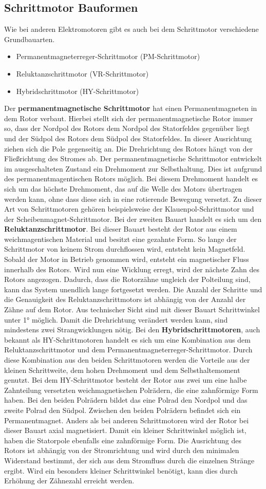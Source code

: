\subsection{Schrittmotor Bauformen}
Wie bei anderen Elektromotoren gibt es auch bei dem Schrittmotor verschiedene Grundbauarten. 
\begin{itemize}
	\item {Permanentmagneterreger-Schrittmotor (PM-Schrittmotor)}
	\item {Reluktanzschrittmotor (VR-Schrittmotor)}
	\item {Hybridschrittmotor (HY-Schrittmotor)}
\end{itemize}
Der \textbf{permanentmagnetische Schrittmotor} hat einen Permanentmagneten in dem Rotor verbaut. Hierbei stellt sich der permanentmagnetische Rotor immer so, dass der Nordpol des Rotors dem Nordpol des Statorfeldes gegenüber liegt und der Südpol des Rotors dem Südpol des Statorfeldes. In dieser Ausrichtung ziehen sich die Pole gegenseitig an. Die Drehrichtung des Rotors hängt von der Fließrichtung des Stromes ab. Der permanentmagnetische Schrittmotor entwickelt im ausgeschalteten Zustand ein Drehmoment zur Selbsthaltung. Dies ist aufgrund des permanentmagentischen Rotors möglich. Bei diesem Drehmoment handelt es sich um das höchste Drehmoment, das auf die Welle des Motors übertragen werden kann, ohne dass diese sich in eine rotierende Bewegung versetzt. Zu dieser Art von Schrittmotoren gehören beispielsweise der Klauenpol-Schrittmotor und der Scheibenmagnet-Schrittmotor. Bei der zweiten Bauart handelt es sich um den \textbf{Reluktanzschrittmotor}. Bei dieser Bauart besteht der Rotor aus einem weichmagentischen Material und besitzt eine gezahnte Form. So lange der Schrittmotor von keinem Strom durchflossen wird, entsteht kein Magnetfeld. Sobald der Motor in Betrieb genommen wird, entsteht ein magnetischer Fluss innerhalb des Rotors. Wird nun eine Wicklung erregt, wird der nächste Zahn des Rotors angezogen. Dadurch, dass die Rotorzähne ungleich der Polteilung sind, kann das System unendlich lange fortgesetzt werden. Die Anzahl der Schritte und die Genauigkeit des Reluktanzschrittmotors ist abhängig von der Anzahl der Zähne auf dem Rotor. Aus technischer Sicht sind mit dieser Bauart Schrittwinkel unter 1° möglich. Damit die Drehrichtung verändert werden kann, sind mindestens zwei Strangwicklungen nötig. Bei den \textbf{Hybridschrittmotoren}, auch bekannt als HY-Schrittmotoren handelt es sich um eine Kombination aus dem Reluktanzschrittmotor und dem Permanentmagneterreger-Schrittmotor. Durch diese Kombination aus den beiden Schrittmotoren werden die Vorteile aus der kleinen Schrittweite, dem hohen Drehmoment und dem Selbsthaltemoment genutzt. Bei dem HY-Schrittmotor besteht der Rotor aus zwei um eine halbe Zahnteilung versetzten weichmagnetischen Polrädern, die eine zahnförmige Form haben. Bei den beiden Polrädern bildet das eine Polrad den Nordpol und das zweite Polrad den Südpol. Zwischen den beiden Polrädern befindet sich ein Permanentmagnet. Anders als bei anderen Schrittmotoren wird der Rotor bei dieser Bauart axial magnetisiert. Damit ein kleiner Schrittwinkel möglich ist, haben die Statorpole ebenfalls eine zahnförmige Form. Die Ausrichtung des Rotors ist abhängig von der Stromrichtung und wird durch den minimalen Widerstand bestimmt, der sich aus dem Stromfluss durch die einzelnen Stränge ergibt. Wird ein besonders kleiner Schrittwinkel benötigt, kann dies durch Erhöhung der Zähnezahl erreicht werden. \cite{Schroder.2013} \cite{Hagl.2021} \cite{Babiel.2023}

